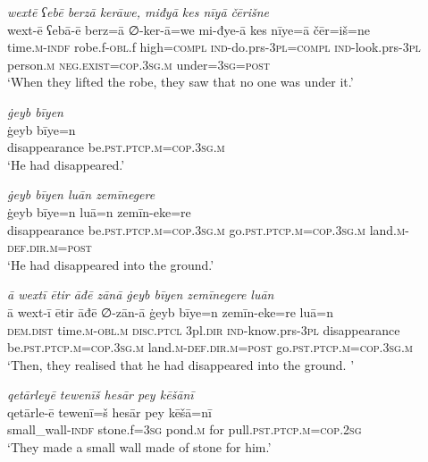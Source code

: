 \ea \label{BP.194}
\textit{wextē ʕebē berzā kerāwe, miđyā kes nīyā čērišne} \\ 
\gll wext-ē ʕebā-ē berz=ā ∅-ker-ā=we mi-đye-ā kes nīye=ā čēr=iš=ne \\ 
 time\textsc{.m}\textsc{-indf} robe.f\textsc{-obl}.f high\textsc{=compl} \textsc{ind-}do.prs\textsc{-3pl}\textsc{=compl} \textsc{ind-}look.prs\textsc{-3pl} person\textsc{.m} \textsc{\textsc{neg.}exist}\textsc{=cop}\textsc{.3sg}\textsc{.m} under\textsc{=3sg}\textsc{=\textsc{post}} \\ 
\glt `When they lifted the robe, they saw that no one was under it.'
\z 
 
\ea \label{BP.195}
\textit{ġeyb bīyen} \\ 
\gll ġeyb bīye=n \\ 
 disappearance be\textsc{.pst}\textsc{.ptcp}\textsc{.m}\textsc{=cop}\textsc{.3sg}\textsc{.m} \\ 
\glt `He had disappeared.'
\z 
 
\ea \label{BP.196}
\textit{ġeyb bīyen luān zemīnegere} \\ 
\gll ġeyb bīye=n luā=n zemīn-eke=re \\ 
 disappearance be\textsc{.pst}\textsc{.ptcp}\textsc{.m}\textsc{=cop}\textsc{.3sg}\textsc{.m} go\textsc{.pst}\textsc{.ptcp}\textsc{.m}\textsc{=cop}\textsc{.3sg}\textsc{.m} land\textsc{.m}\textsc{-def}\textsc{.dir}\textsc{.m}\textsc{=\textsc{post}} \\ 
\glt `He had disappeared into the ground.'
\z 
 
\ea \label{BP.197}
\textit{ā wextī ētir āđē zānā ġeyb bīyen zemīnegere luān} \\ 
\gll ā wext-ī ētir āđē ∅-zān-ā ġeyb bīye=n zemīn-eke=re luā=n \\ 
 \textsc{dem.dist} time\textsc{.m}\textsc{-obl}\textsc{.m} \textsc{disc.ptcl} 3pl\textsc{.dir} \textsc{ind-}know.prs\textsc{-3pl} disappearance be\textsc{.pst}\textsc{.ptcp}\textsc{.m}\textsc{=cop}\textsc{.3sg}\textsc{.m} land\textsc{.m}\textsc{-def}\textsc{.dir}\textsc{.m}\textsc{=\textsc{post}} go\textsc{.pst}\textsc{.ptcp}\textsc{.m}\textsc{=cop}\textsc{.3sg}\textsc{.m} \\ 
\glt `Then, they realised that he had disappeared into the ground. '
\z 
 
\ea \label{BP.199}
\textit{qetārleyē tewenīš hesār pey kēšānī} \\ 
\gll qetārle-ē tewenī=š hesār pey kēšā=nī \\ 
 small\_wall\textsc{-indf} stone.f\textsc{=3sg} pond\textsc{.m} for pull\textsc{.pst}\textsc{.ptcp}\textsc{.m}\textsc{=cop}\textsc{.\textsc{2sg}} \\ 
\glt `They made a small wall made of stone for him.'
\z 
 
